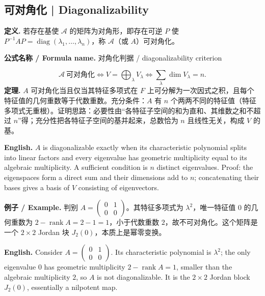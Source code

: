\documentclass[UTF8,11pt,a4paper]{ctexart}
\newcommand{\EN}[1]{\par\noindent\textbf{English.} #1\par}
\newcommand{\FORMULA}[2]{\par\noindent\textbf{公式名称 / Formula name.} #1 / #2\par}
\newcommand{\EX}[2]{\par\noindent\textbf{例子 / Example.} #1\par\EN{#2}}
\begin{document}
\subsection{可对角化 | Diagonalizability}
\noindent\textbf{定义.} 若存在基使 $\mathcal A$ 的矩阵为对角形，即存在可逆 $P$ 使 $P^{-1}AP=\operatorname{diag}(\lambda_1,\dots,\lambda_n)$，称 $\mathcal A$（或 $A$）可对角化。
\FORMULA{对角化判据}{diagonalizability criterion}
\[
\mathcal A\ \text{可对角化}\iff V=\bigoplus_{\lambda}V_\lambda \iff \sum_{\lambda}\dim V_\lambda=n.
\]
\noindent\textbf{定理.} $A$ 可对角化当且仅当其特征多项式在 $F$ 上可分解为一次因式之积，且每个特征值的几何重数等于代数重数。充分条件：$A$ 有 $n$ 个两两不同的特征值（特征多项式无重根）。证明思路：必要性由“各特征子空间的和为直和、其维数之和不超过 $n$”得；充分性把各特征子空间的基并起来，总数恰为 $n$ 且线性无关，构成 $V$ 的基。
\EN{$A$ is diagonalizable exactly when its characteristic polynomial splits into linear factors and every eigenvalue has geometric multiplicity equal to its algebraic multiplicity. A sufficient condition is $n$ distinct eigenvalues. Proof: the eigenspaces form a direct sum and their dimensions add to $n$; concatenating their bases gives a basis of $V$ consisting of eigenvectors.}
\EX{判别 $A=\begin{pmatrix}0&1\\0&0\end{pmatrix}$。其特征多项式为 $\lambda^2$，唯一特征值 $0$ 的几何重数为 $2-\operatorname{rank}A=2-1=1$，小于代数重数 $2$，故不可对角化。这个矩阵是一个 $2\times2$ Jordan 块 $J_2(0)$，本质上是幂零变换。}{Consider $A=\begin{pmatrix}0&1\\0&0\end{pmatrix}$. Its characteristic polynomial is $\lambda^2$; the only eigenvalue $0$ has geometric multiplicity $2-\operatorname{rank}A=1$, smaller than the algebraic multiplicity $2$, so $A$ is not diagonalizable. It is the $2\times2$ Jordan block $J_2(0)$, essentially a nilpotent map.}
\end{document}
